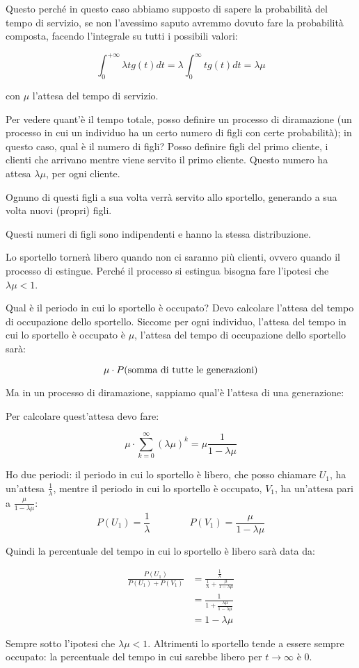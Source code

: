\documentclass[a4paper,12pt]{book}
\begin{document}
Questo perché in questo caso abbiamo supposto di sapere la probabilità del tempo di servizio, se non l'avessimo saputo avremmo dovuto fare la probabilità composta, facendo l'integrale su tutti i possibili valori:

$$ \int_{0}^{+\infty} \lambda t g(t) dt = \lambda \int_0^\infty t g(t) dt = \lambda\mu $$

con $\mu$ l'attesa del tempo di servizio.

Per vedere quant'è il tempo totale, posso definire un processo di diramazione (un processo in cui un individuo ha un certo numero di figli con certe probabilità); in questo caso, qual è il numero di figli? Posso definire figli del primo cliente, i clienti che arrivano mentre viene servito il primo cliente. Questo numero ha attesa $\lambda\mu$, per ogni cliente. 

Ognuno di questi figli a sua volta verrà servito allo sportello, generando a sua volta nuovi (propri) figli. 

Questi numeri di figli sono indipendenti e hanno la stessa distribuzione.

Lo sportello tornerà libero quando non ci saranno più clienti, ovvero quando il processo di estingue. Perché il processo si estingua bisogna fare l'ipotesi che $\lambda\mu < 1$.

Qual è il periodo in cui lo sportello è occupato? Devo calcolare l'attesa del tempo di occupazione dello sportello. Siccome per ogni individuo, l'attesa del tempo in cui lo sportello è occupato è $ \mu $, l'attesa del tempo di occupazione dello sportello sarà:

$$ \mu \cdot P(\textnormal{somma di tutte le generazioni})$$

Ma in un processo di diramazione, sappiamo qual'è l'attesa di una generazione: 

Per calcolare quest'attesa devo fare:

$$ \mu\cdot \sum_{k=0}^\infty (\lambda\mu)^k = \mu \frac{1}{1 - \lambda\mu}$$

Ho due periodi: il periodo in cui lo sportello è libero, che posso chiamare $ U_1 $, ha un'attesa $\frac{1}{\lambda}$, mentre il periodo in cui lo sportello è occupato, $ V_1 $, ha un'attesa pari a $ \frac{\mu}{1-\lambda\mu} $:
$$ P(U_1) = \frac{1}{\lambda} \qquad \qquad P(V_1) = \frac{\mu}{1 - \lambda\mu} $$

Quindi la percentuale del tempo in cui lo sportello è libero sarà data da:

\begin{align*}
	\frac{P(U_1)}{P(U_1) + P(V_1)} & = \frac{\frac{1}{\lambda}}{\frac{1}{\lambda} + \frac{\mu}{1 - \lambda\mu}} \\
	& = \frac{1}{1 + \frac{\lambda\mu}{1 - \lambda\mu}} \\
	& = 1 - \lambda \mu
\end{align*}

Sempre sotto l'ipotesi che $\lambda\mu < 1$. Altrimenti lo sportello tende a essere sempre occupato: la percentuale del tempo in cui sarebbe libero per $ t \to \infty $ è 0. 



\backmatter
\end{document}

